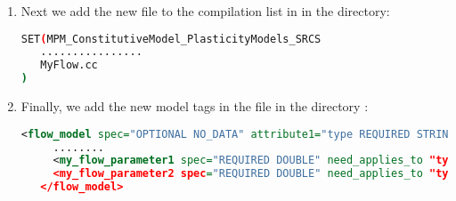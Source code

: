 \begin{enumerate}
  \item Next we add the new file to the compilation list in 
        in the  directory:
\begin{lstlisting}[language=sh, backgroundcolor=\color{background}]
SET(MPM_ConstitutiveModel_PlasticityModels_SRCS
   ................
   MyFlow.cc
)
\end{lstlisting}

  \item Finally, we add the new model tags in the  file 
        in the directory :
\begin{lstlisting}[language=XML]
   <flow_model spec="OPTIONAL NO_DATA" attribute1="type REQUIRED STRING 'isotropic_hardening, johnson_cook, mts_model, .... , zerilli_armstrong_polymer, my_flow_model'" >
     ........
     <my_flow_parameter1 spec="REQUIRED DOUBLE" need_applies_to "type my_flow_model"/>
     <my_flow_parameter2 spec="REQUIRED DOUBLE" need_applies_to "type my_flow_model"/>
   </flow_model>
\end{lstlisting}

\end{enumerate}

